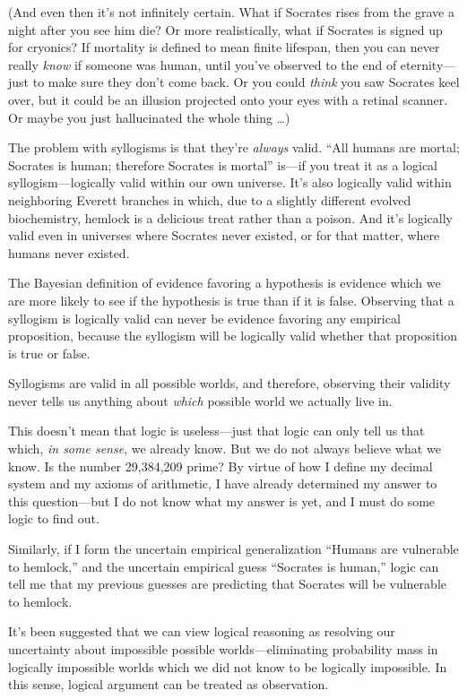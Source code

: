 {
 (And even then it's not infinitely certain. What
if Socrates rises from the grave a night after you see him die? Or more
realistically, what if Socrates is signed up for cryonics? If mortality
is defined to mean finite lifespan, then you can never really
\textit{know} if someone was human, until you've
observed to the end of eternity---just to make sure they
don't come back. Or you could \textit{think} you saw
Socrates keel over, but it could be an illusion projected onto your
eyes with a retinal scanner. Or maybe you just hallucinated the whole
thing \ldots)}

{
 The problem with syllogisms is that they're
\textit{always} valid. ``All humans are mortal;
Socrates is human; therefore Socrates is mortal''
is---if you treat it as a logical syllogism---logically valid within
our own universe. It's also logically valid within
neighboring Everett branches in which, due to a slightly different
evolved biochemistry, hemlock is a delicious treat rather than a
poison. And it's logically valid even in universes
where Socrates never existed, or for that matter, where humans never
existed.}

{
 The Bayesian definition of evidence favoring a hypothesis is
evidence which we are more likely to see if the hypothesis is true than
if it is false. Observing that a syllogism is logically valid can never
be evidence favoring any empirical proposition, because the syllogism
will be logically valid whether that proposition is true or false.}

{
 Syllogisms are valid in all possible worlds, and therefore,
observing their validity never tells us anything about \textit{which}
possible world we actually live in.}

{
 This doesn't mean that logic is useless---just
that logic can only tell us that which, \textit{in some sense}, we
already know. But we do not always believe what we know. Is the number
29,384,209 prime? By virtue of how I define my decimal system and my
axioms of arithmetic, I have already determined my answer to this
question---but I do not know what my answer is yet, and I must do some
logic to find out.}

{
 Similarly, if I form the uncertain empirical generalization
``Humans are vulnerable to
hemlock,'' and the uncertain empirical guess
``Socrates is human,'' logic can
tell me that my previous guesses are predicting that Socrates will be
vulnerable to hemlock.}

{
 It's been suggested that we can view logical
reasoning as resolving our uncertainty about impossible possible
worlds---eliminating probability mass in logically impossible worlds
which we did not know to be logically impossible. In this sense,
logical argument can be treated as observation.}

